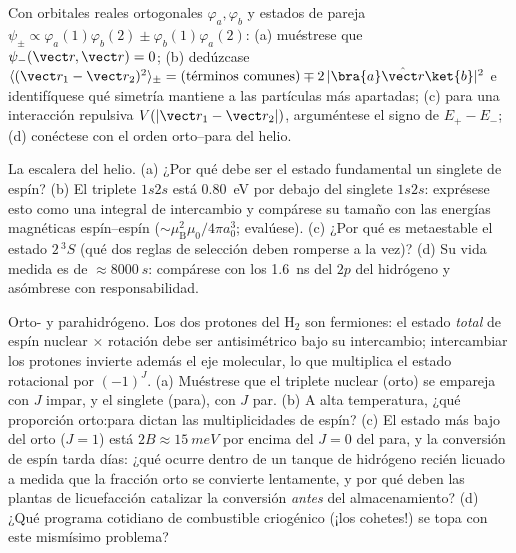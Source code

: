 \begin{exercise}[$\star\star$]\label{exo:b3:identical-particles:6}
Con orbitales reales ortogonales $\varphi_a, \varphi_b$ y estados de pareja
$\psi_\pm \propto \varphi_a(1)\varphi_b(2) \pm
\varphi_b(1)\varphi_a(2)$: (a) muéstrese que $\psi_-(\vect r, \vect r) = 0$;
(b) dedúzcase
$\langle(\vect r_1 - \vect r_2)^2\rangle_\pm =
(\text{términos comunes}) \mp 2\,|\bra{a}\hat{\vect r}\ket{b}|^2$ e
identifíquese qué simetría mantiene a las partículas más apartadas; (c) para
una interacción repulsiva $V(|\vect r_1 - \vect r_2|)$, arguméntese el
signo de $E_+ - E_-$; (d) conéctese con el orden orto--para del helio.
\end{exercise}

\begin{exercise}[$\star\star$]\label{exo:b3:identical-particles:7}
La escalera del helio. (a) ¿Por qué debe ser el estado fundamental un
singlete de espín? (b) El triplete $1s2s$ está \qty{0.80}{eV} por debajo del
singlete $1s2s$: exprésese esto como una integral de intercambio y compárese su
tamaño con las energías magnéticas espín--espín ($\sim\mu_{\text{B}}^2\mu_0/4\pi
a_0^3$; evalúese). (c) ¿Por qué es metaestable el estado $2\,^3S$
(qué dos reglas de selección deben romperse a la vez)? (d) Su vida medida
es de $\approx\qty{8000}{s}$: compárese con los \qty{1.6}{ns} del
$2p$ del hidrógeno y asómbrese con responsabilidad.
\end{exercise}

\begin{exercise}[$\star\star$]\label{exo:b3:identical-particles:8}
Orto- y parahidrógeno. Los dos protones del H$_2$ son fermiones:
el estado \emph{total} de espín nuclear $\times$ rotación debe ser
antisimétrico bajo su intercambio; intercambiar los protones invierte además
el eje molecular, lo que multiplica el estado rotacional por
$(-1)^J$. (a) Muéstrese que el triplete nuclear (orto) se empareja con $J$
impar, y el singlete (para), con $J$ par. (b) A alta temperatura, ¿qué
proporción orto:para dictan las multiplicidades de espín? (c) El
estado más bajo del orto ($J = 1$) está $2B \approx \qty{15}{meV}$
por encima del $J = 0$ del para, y la conversión de espín tarda días: ¿qué
ocurre dentro de un tanque de hidrógeno recién licuado a medida que la
fracción orto se convierte lentamente, y por qué deben las plantas de
licuefacción catalizar la conversión \emph{antes} del almacenamiento? (d)
¿Qué programa cotidiano de combustible criogénico (¡los cohetes!) se topa
con este mismísimo problema?
\end{exercise}

